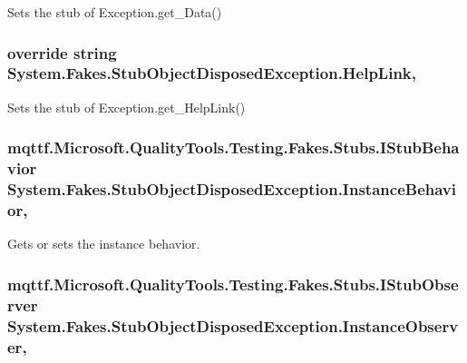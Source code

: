 Sets the stub of Exception.\-get\-\_\-\-Data()

\hypertarget{class_system_1_1_fakes_1_1_stub_object_disposed_exception_a3eb40fb2f33e001c355468139520668d}{
\subsubsection[{Help\-Link}]{\setlength{\rightskip}{0pt plus 5cm}override string System.\-Fakes.\-Stub\-Object\-Disposed\-Exception.\-Help\-Link\hspace{0.3cm}{\ttfamily [get]}, {\ttfamily [set]}}}\label{class_system_1_1_fakes_1_1_stub_object_disposed_exception_a3eb40fb2f33e001c355468139520668d}


Sets the stub of Exception.\-get\-\_\-\-Help\-Link()

\hypertarget{class_system_1_1_fakes_1_1_stub_object_disposed_exception_a39dc6bb4b1ebe09943f4907cb8e112ba}{
\subsubsection[{Instance\-Behavior}]{\setlength{\rightskip}{0pt plus 5cm}mqttf.\-Microsoft.\-Quality\-Tools.\-Testing.\-Fakes.\-Stubs.\-I\-Stub\-Behavior System.\-Fakes.\-Stub\-Object\-Disposed\-Exception.\-Instance\-Behavior\hspace{0.3cm}{\ttfamily [get]}, {\ttfamily [set]}}}\label{class_system_1_1_fakes_1_1_stub_object_disposed_exception_a39dc6bb4b1ebe09943f4907cb8e112ba}


Gets or sets the instance behavior.

\hypertarget{class_system_1_1_fakes_1_1_stub_object_disposed_exception_a67c32e7fdd2d06fad20becc17c88af50}{
\subsubsection[{Instance\-Observer}]{\setlength{\rightskip}{0pt plus 5cm}mqttf.\-Microsoft.\-Quality\-Tools.\-Testing.\-Fakes.\-Stubs.\-I\-Stub\-Observer System.\-Fakes.\-Stub\-Object\-Disposed\-Exception.\-Instance\-Observer\hspace{0.3cm}{\ttfamily [get]}, {\ttfamily [set]}}}\label{class_system_1_1_fakes_1_1_stub_object_disposed_exception_a67c32e7fdd2d06fad20becc17c88af50}


